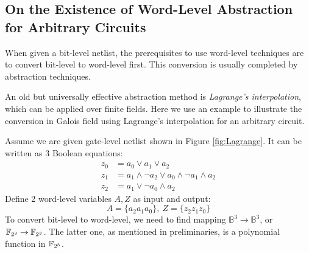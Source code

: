 \subsection{On the Existence of Word-Level Abstraction for Arbitrary Circuits}
When given a bit-level netlist, the prerequisites to use word-level techniques are to convert bit-level 
to word-level first. This conversion is usually completed by abstraction techniques.

An old but universally effective abstraction method is {\it Lagrange's interpolation}, 
which can be applied over finite fields. Here we use an example to illustrate the 
conversion in Galois field using Lagrange's interpolation for an arbitrary circuit.

\begin{Example}

\begin{figure}[H]
\end{figure}

Assume we are given gate-level netlist shown in Figure \ref{fig:Lagrange}. It can be written as 3 
Boolean equations:
\begin{align*}
z_0 &= a_0 \lor a_1 \lor a_2 \\
z_1 &= a_1 \land \neg a_2 \lor a_0 \land \neg a_1 \land a_2 \\
z_2 &= a_1 \lor \neg a_0 \land a_2
\end{align*}
Define 2 word-level variables $A,Z$ as input and output:
$$A = \{a_2a_1a_0\},~Z = \{z_2z_1z_0\}$$
To convert bit-level to word-level, we need to find mapping $\mathbb{B}^3 \rightarrow \mathbb{B}^3$,
or ${\mathbb{F}}_{2^3} \rightarrow {\mathbb{F}}_{2^3}$. The latter one, as mentioned in preliminaries, is a polynomial
function in ${\mathbb{F}}_{2^3}$.


\end{Example}
